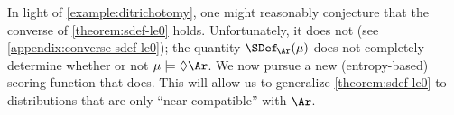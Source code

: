 %
In light of \cref{example:ditrichotomy}, one might reasonably conjecture that the converse of \cref{theorem:sdef-le0} holds.
Unfortunately, it does not (see \cref{appendix:converse-sdef-le0});
the quantity $\SDef_{\!\Ar}(\mu)$ does not 
completely determine whether or not 
$\mu \models \Diamond \Ar$. We now pursue a new (entropy-based) scoring function that does.
This will allow us to generalize \cref{theorem:sdef-le0} to distributions that are only ``near-compatible'' with $\Ar$. 

